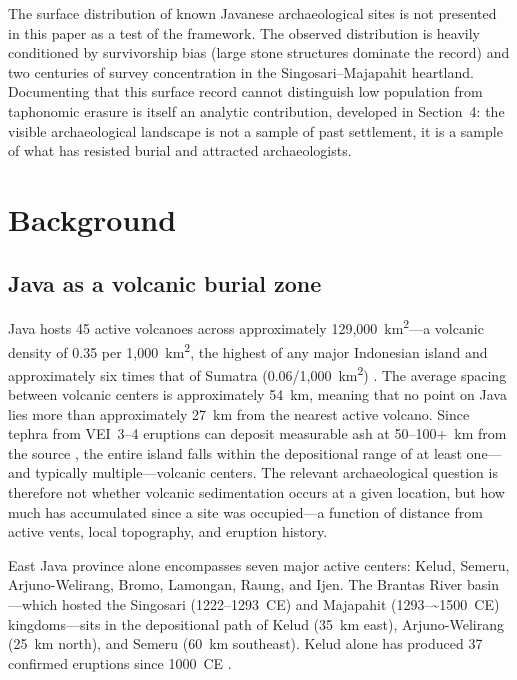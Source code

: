 \documentclass[12pt,a4paper]{article}
\begin{document}
The surface distribution of known Javanese archaeological sites is not presented in this paper as a test of the framework. The observed distribution is heavily conditioned by survivorship bias (large stone structures dominate the record) and two centuries of survey concentration in the Singosari--Majapahit heartland. Documenting that this surface record cannot distinguish low population from taphonomic erasure is itself an analytic contribution, developed in Section~4: the visible archaeological landscape is not a sample of past settlement, it is a sample of what has resisted burial and attracted archaeologists.


\section{Background}

\subsection{Java as a volcanic burial zone}

Java hosts 45 active volcanoes across approximately 129,000~km\textsuperscript{2}---a volcanic density of 0.35 per 1,000~km\textsuperscript{2}, the highest of any major Indonesian island and approximately six times that of Sumatra (0.06/1,000~km\textsuperscript{2}) \citep{vanbemmelen1949}. The average spacing between volcanic centers is approximately 54~km, meaning that no point on Java lies more than approximately 27~km from the nearest active volcano. Since tephra from VEI~3--4 eruptions can deposit measurable ash at 50--100+~km from the source \citep{newhall1982}, the entire island falls within the depositional range of at least one---and typically multiple---volcanic centers. The relevant archaeological question is therefore not whether volcanic sedimentation occurs at a given location, but how much has accumulated since a site was occupied---a function of distance from active vents, local topography, and eruption history.

East Java province alone encompasses seven major active centers: Kelud, Semeru, Arjuno-Welirang, Bromo, Lamongan, Raung, and Ijen. The Brantas River basin---which hosted the Singosari (1222--1293~CE) and Majapahit (1293--\textasciitilde1500~CE) kingdoms---sits in the depositional path of Kelud (35~km east), Arjuno-Welirang (25~km north), and Semeru (60~km southeast). Kelud alone has produced 37 confirmed eruptions since 1000~CE \citep{gvp2024,maeno2019}.
\end{document}
